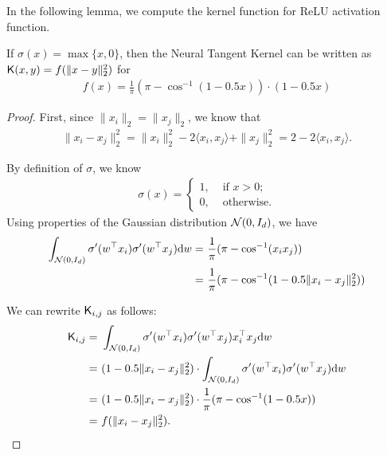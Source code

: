 In the following lemma, we compute the kernel function for ReLU activation function.
\begin{lemma}\label{lem:ntk_relu}
If $\sigma(x) = \max\{x,0\}$, then the Neural Tangent Kernel can be written as $\mathsf{K}(x,y) = f(\|x-y\|_2^2)$ for
\begin{align*}
f(x) = \frac{1}{\pi} ( \pi - \cos^{-1} ( 1 - 0.5 x ) ) \cdot (1 - 0.5 x)
\end{align*}
\end{lemma}
\begin{proof}

First, since $\| x_i \|_2 = \|x_j\|_2$, we know that
\begin{align*}
\| x_i - x_j \|_2^2 = \| x_i \|_2^2 - 2 \langle x_i , x_j \rangle + \| x_j \|_2^2 = 2 - 2\langle x_i, x_j \rangle.
\end{align*}

By definition of $\sigma$, we know 
\begin{align*}
\sigma(x) =  
\begin{cases}
1, & \text{~if~} x > 0; \\
0, & \text{~otherwise.}
\end{cases}
\end{align*}
Using properties of the Gaussian distribution ${\cal N}(0,I_d)$, we have
\begin{align*}
\int_{\mathcal{N}(0,I_d)} \sigma'(w^\top x_i)\sigma'(w^\top x_j) \mathrm{d} w 
= & ~ \frac{1}{\pi} (\pi - \cos^{-1} ( x_i x_j ) ) \\
= & ~ \frac{1}{\pi} (\pi - \cos^{-1} ( 1 - 0.5 \| x_i - x_j \|_2^2 ) )
\end{align*}


We can rewrite $\mathsf{K}_{i,j}$ as follows:
\begin{align*}
\mathsf{K}_{i,j} 
= & ~ \int_{\mathcal{N}(0,I_d)} \sigma'(w^\top x_i)\sigma'(w^\top x_j) x_i^\top x_j \mathrm{d} w \\
= & ~ (1-0.5 \| x_i - x_j \|_2^2) \cdot \int_{\mathcal{N}(0,I_d)} \sigma'(w^\top x_i)\sigma'(w^\top x_j) \mathrm{d} w \\
= & ~ (1-0.5 \| x_i - x_j \|_2^2) \cdot \frac{1}{\pi} ( \pi - \cos^{-1} ( 1 - 0.5 x ) )\\
= & ~ f( \| x_i - x_j \|_2^2 ) .
\end{align*}

\end{proof}


